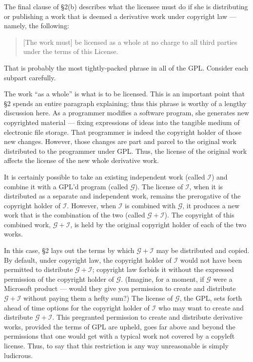 \documentclass[11pt, letterpaper]{book}
\begin{document}
The final clause of \S 2(b) describes what the licensee must do if she is
distributing or publishing a work that is deemed a derivative work under
copyright law --- namely, the following:
\begin{quote}
[The work must] be licensed as a whole at no charge to all third parties
under the terms of this License.
\end{quote}
That is probably the most tightly-packed phrase in all of the GPL\@.
Consider each subpart carefully.

The work ``as a whole'' is what is to be licensed. This is an important
point that \S 2 spends an entire paragraph explaining; thus this phrase is
worthy of a lengthy discussion here. As a programmer modifies a software
program, she generates new copyrighted material --- fixing expressions of
ideas into the tangible medium of electronic file storage. That
programmer is indeed the copyright holder of those new changes. However,
those changes are part and parcel to the original work distributed to
the programmer under GPL\@. Thus, the license of the original work
affects the license of the new whole derivative work.

\newcommand{\gplusi}{$\mathcal{G\!\!+\!\!I}$}
\newcommand{\worki}{$\mathcal{I}$}
\newcommand{\workg}{$\mathcal{G}$}

\label{separate-and-independent}

It is certainly possible to take an existing independent work (called
\worki{}) and combine it with a GPL'd program (called \workg{}). The
license of \worki{}, when it is distributed as a separate and independent
work, remains the prerogative of the copyright holder of \worki{}.
However, when \worki{} is combined with \workg{}, it produces a new work
that is the combination of the two (called \gplusi{}). The copyright of
this combined work, \gplusi{}, is held by the original copyright
holder of each of the two works.

In this case, \S 2 lays out the terms by which \gplusi{} may be
distributed and copied. By default, under copyright law, the copyright
holder of \worki{} would not have been permitted to distribute \gplusi{};
copyright law forbids it without the expressed permission of the copyright
holder of \workg{}. (Imagine, for a moment, if \workg{} were a Microsoft
product --- would they give you permission to create and distribute
\gplusi{} without paying them a hefty sum?)  The license of \workg{}, the
GPL, sets forth ahead of time options for the copyright holder of \worki{}
who may want to create and distribute \gplusi{}. This pregranted
permission to create and distribute derivative works, provided the terms
of GPL are upheld, goes far above and beyond the permissions that one
would get with a typical work not covered by a copyleft license. Thus, to
say that this restriction is any way unreasonable is simply ludicrous.
\end{document}

